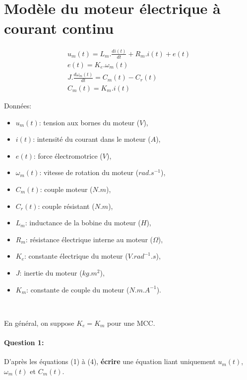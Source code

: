 



\\

\legendeniveaux

\\

\section{Modèle du moteur électrique à courant continu}

\begin{eqnarray}
u_m(t)=L_m.\frac{di(t)}{dt}+R_m.i(t)+e(t) \\
e(t)=K_e.\omega_m(t) \\
J.\frac{d\omega_m(t)}{dt}=C_m(t)-C_r(t) \\
C_m(t)=K_m.i(t)
\end{eqnarray}

Données:
\begin{itemize}
 \item $u_m(t)$: tension aux bornes du moteur ($V$),
 \item $i(t)$: intensité du courant dans le moteur ($A$),
 \item $e(t)$: force électromotrice ($V$),
 \item $\omega_m(t)$: vitesse de rotation du moteur ($rad.s^{-1}$),
 \item $C_m(t)$: couple moteur ($N.m$),
 \item $C_r(t)$: couple résistant ($N.m$),
 \item $L_m$: inductance de la bobine du moteur ($H$),
 \item $R_m$: résistance électrique interne au moteur ($\Omega$),
 \item $K_e$: constante électrique du moteur ($V.rad^{-1}.s$),
 \item $J$: inertie du moteur ($kg.m^2$),
 \item $K_m$: constante de couple du moteur ($N.m.A^{-1}$).
\end{itemize}

~\

En général, on suppose $K_e=K_m$ pour une MCC.

\paragraph{Question 1:} D'après les équations (1) à (4), \textbf{écrire} une équation liant uniquement $u_m(t)$, $\omega_m(t)$ et $C_m(t)$.

